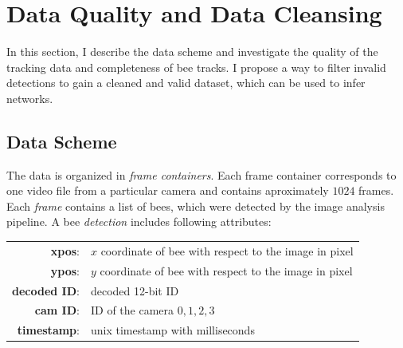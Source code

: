 \section{Data Quality and Data Cleansing}
In this section, I describe the data scheme and investigate the quality of the tracking data and completeness of bee tracks. I propose a way to filter invalid detections to gain a cleaned and valid dataset, which can be used to infer networks.

\subsection{Data Scheme}
\label{subsec:scheme}

The data is organized in \emph{frame containers}.
Each frame container corresponds to one video file from a particular camera and contains aproximately $1024$ frames.
Each \emph{frame} contains a list of bees, which were detected by the image analysis pipeline.
A bee \emph{detection} includes following attributes:

\begin{table}[!h]
\small
\centering
\begin{tabular}{rl}
\textbf{xpos}: & $x$ coordinate of bee with respect to the image in pixel \vspace{2mm}\\
\textbf{ypos}: & $y$ coordinate of bee with respect to the image in pixel \vspace{2mm}\\
\textbf{decoded ID}: & decoded 12-bit ID \vspace{2mm}\\
\textbf{cam ID}: & ID of the camera ${0,1,2,3}$ \vspace{2mm}\\
\textbf{timestamp}: & unix timestamp with milliseconds\\
\end{tabular}
\end{table}

